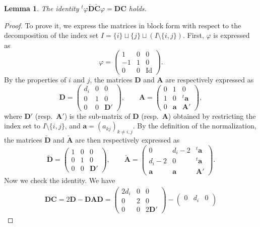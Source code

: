 \documentclass[pdftex]{sigma}
\numberwithin{equation}{section}
\newtheorem{Lemma}[Theorem]{Lemma}
\theoremstyle{definition}
\newcommand{\unit}{\mathrm{Id}}
\newcommand{\bA}{\mathbf{A}} %
\newcommand{\bD}{\mathbf{D}} %
\newcommand{\bC}{\mathbf{C}} %
\begin{document}
\begin{Lemma}
The identity
${}^t \varphi \check{\bD} \check{\bC} \varphi = \bD \bC$ holds.
\end{Lemma}

\begin{proof}
To prove it, we express the matrices in block form with respect to
the decomposition of the index set
$I=\{ i \} \sqcup \{ j \} \sqcup (I \setminus \{ i,j \})$.
First, $\varphi$ is expressed as
\[
\varphi =
\begin{pmatrix}
1  & 0 & 0 \\
-1 & 1 & 0 \\
0  & 0 & \unit
\end{pmatrix}.
\]
By the properties of $i$ and $j$, the matrices
$\bD$ and $\bA$ are respectively expressed as
\[
\bD =
\begin{pmatrix}
d_i & 0 & 0 \\
0 & 1 & 0 \\
0 & 0 & \bD'
\end{pmatrix}, \qquad
\bA =
\begin{pmatrix}
0 & 1 & 0 \\
1 & 0 & {}^t \mathbf{a} \\
0 & \mathbf{a} & \bA'
\end{pmatrix},
\]
where $\bD'$ (resp.\ $\bA'$) is the sub-matrix of $\bD$ (resp.\ $\bA$)
obtained by restricting the index set to $I \setminus \{ i,j \}$,
and $\mathbf{a}=(a_{kj})_{k\neq i,j}$.
By the def\/inition of the normalization,
the matrices $\check{\bD}$ and $\check{\bA}$ are then respectively
expressed as
\[
\check{\bD} =
\begin{pmatrix}
1 & 0 & 0 \\
0 & 1 & 0 \\
0 & 0 & \bD'
\end{pmatrix}, \qquad
\check{\bA} =
\begin{pmatrix}
0 & d_i-2 & {}^t \mathbf{a} \\
d_i-2 & 0 & {}^t \mathbf{a} \\
\mathbf{a} & \mathbf{a} & \bA'
\end{pmatrix}.
\]
Now we check the identity. We have
\begin{gather*}
\bD \bC = 2\bD - \bD \bA \bD
 = \begin{pmatrix}
2d_i & 0 & 0 \\
0 & 2 & 0 \\
0 & 0 & 2\bD'
\end{pmatrix} -
\begin{pmatrix}
0 & d_i & 0 \\

\end{pmatrix}
\end{gather*}
\end{proof}
\end{document}
